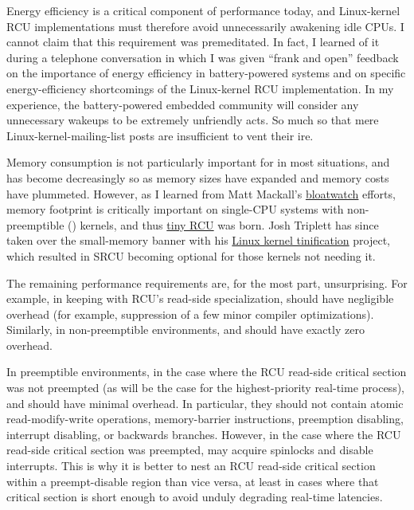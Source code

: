 Energy efficiency is a critical component of performance today, and
Linux-kernel RCU implementations must therefore avoid unnecessarily
awakening idle CPUs.
I cannot claim that this requirement was
premeditated.
In fact, I learned of it during a telephone conversation
in which I was given ``frank and open'' feedback on the importance of
energy efficiency in battery-powered systems and on specific
energy-efficiency shortcomings of the Linux-kernel RCU implementation.
In my experience, the battery-powered embedded community will consider
any unnecessary wakeups to be extremely unfriendly acts.
So much so that
mere Linux-kernel-mailing-list posts are insufficient to vent their ire.

Memory consumption is not particularly important for in most situations,
and has become decreasingly so as memory sizes have expanded and memory
costs have plummeted.
However, as I learned from Matt Mackall's
\href{http://elinux.org/Linux_Tiny-FAQ}{bloatwatch} efforts, memory
footprint is critically important on single-CPU systems with
non-preemptible () kernels, and thus
\href{https://lore.kernel.org/r/20090113221724.GA15307@linux.vnet.ibm.com}{tiny RCU}
was born.
Josh Triplett has since taken over the small-memory banner
with his \href{https://tiny.wiki.kernel.org/}{Linux kernel tinification}
project, which resulted in SRCU %
becoming optional
for those kernels not needing it.

The remaining performance requirements are, for the most part,
unsurprising.
For example, in keeping with RCU's read-side
specialization,  should have negligible overhead
(for example, suppression of a few minor compiler optimizations).
Similarly, in non-preemptible environments,  and
 should have exactly zero overhead.

In preemptible environments, in the case where the RCU read-side
critical section was not preempted (as will be the case for the
highest-priority real-time process),  and
 should have minimal overhead.
In particular, they
should not contain atomic read-modify-write operations, memory-barrier
instructions, preemption disabling, interrupt disabling, or backwards
branches.
However, in the case where the RCU read-side critical section
was preempted,  may acquire spinlocks and disable
interrupts.
This is why it is better to nest an RCU read-side critical
section within a preempt-disable region than vice versa, at least in
cases where that critical section is short enough to avoid unduly
degrading real-time latencies.

